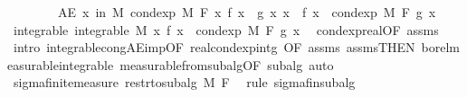 \begin{isabellebody}
\ \ \ \ \ \ \ \ {\isachardoublequoteopen}AE\ x\ in\ M{\isachardot}{\kern0pt}\ cond{\isacharunderscore}{\kern0pt}exp\ M\ F\ {\isacharparenleft}{\kern0pt}{\isasymlambda}x{\isachardot}{\kern0pt}\ f\ x\ {\isacharasterisk}{\kern0pt}\ g\ x{\isacharparenright}{\kern0pt}\ x\ {\isacharequal}{\kern0pt}\ f\ x\ {\isacharasterisk}{\kern0pt}\ cond{\isacharunderscore}{\kern0pt}exp\ M\ F\ g\ x{\isachardoublequoteclose}\isanewline
%
\isadelimproof
%
\endisadelimproof
%
\isatagproof
{}\isamarkupfalse%
{\isacharminus}{\kern0pt}\isanewline
\ \ \isamarkupfalse%
\ integrable{\isacharcolon}{\kern0pt}\ {\isachardoublequoteopen}integrable\ M\ {\isacharparenleft}{\kern0pt}{\isasymlambda}x{\isachardot}{\kern0pt}\ f\ x\ {\isacharasterisk}{\kern0pt}\ cond{\isacharunderscore}{\kern0pt}exp\ M\ F\ g\ x{\isacharparenright}{\kern0pt}{\isachardoublequoteclose}\ \isamarkupfalse%
\ cond{\isacharunderscore}{\kern0pt}exp{\isacharunderscore}{\kern0pt}real{\isacharbrackleft}{\kern0pt}OF\ assms{\isacharparenleft}{\kern0pt}{}{\isacharparenright}{\kern0pt}{\isacharbrackright}{\kern0pt}\ \isamarkupfalse%
\ {\isacharparenleft}{\kern0pt}intro\ integrable{\isacharunderscore}{\kern0pt}cong{\isacharunderscore}{\kern0pt}AE{\isacharunderscore}{\kern0pt}imp{\isacharbrackleft}{\kern0pt}OF\ real{\isacharunderscore}{\kern0pt}cond{\isacharunderscore}{\kern0pt}exp{\isacharunderscore}{\kern0pt}intg{\isacharparenleft}{\kern0pt}{}{\isacharparenright}{\kern0pt}{\isacharcomma}{\kern0pt}\ OF\ assms{\isacharparenleft}{\kern0pt}{}{\isacharcomma}{\kern0pt}{}{\isacharparenright}{\kern0pt}\ assms{\isacharparenleft}{\kern0pt}{}{\isacharparenright}{\kern0pt}{\isacharbrackleft}{\kern0pt}THEN\ borel{\isacharunderscore}{\kern0pt}measurable{\isacharunderscore}{\kern0pt}integrable{\isacharbrackright}{\kern0pt}{\isacharbrackright}{\kern0pt}\ measurable{\isacharunderscore}{\kern0pt}from{\isacharunderscore}{\kern0pt}subalg{\isacharbrackleft}{\kern0pt}OF\ subalg{\isacharbrackright}{\kern0pt}{\isacharparenright}{\kern0pt}\ auto\isanewline
\ \ \isamarkupfalse%
\ sigma{\isacharunderscore}{\kern0pt}finite{\isacharunderscore}{\kern0pt}measure\ {\isachardoublequoteopen}restr{\isacharunderscore}{\kern0pt}to{\isacharunderscore}{\kern0pt}subalg\ M\ F{\isachardoublequoteclose}\ \isamarkupfalse%
\ {\isacharparenleft}{\kern0pt}rule\ sigma{\isacharunderscore}{\kern0pt}fin{\isacharunderscore}{\kern0pt}subalg{\isacharparenright}{\kern0pt}\isanewline
\ \ \isacommand{{\isacharbraceleft}{\kern0pt}}\isamarkupfalse%

\end{isabellebody}
